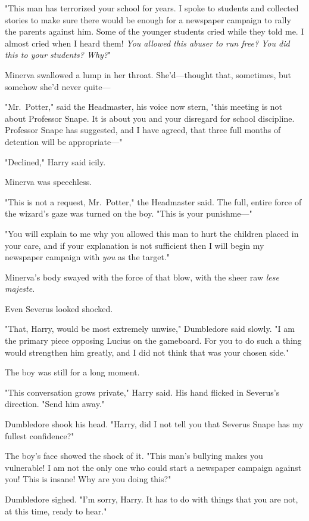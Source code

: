 "This man has terrorized your school for years. I spoke to students and 
collected stories to make sure there would be enough for a newspaper campaign 
to rally the parents against him. Some of the younger students cried while they 
told me. I almost cried when I heard them! \emph{You allowed this abuser to run 
free? You did this to your students? Why?}"

Minerva swallowed a lump in her throat. She'd---thought that, sometimes, but 
somehow she'd never quite---

"Mr.~Potter," said the Headmaster, his voice now stern, "this meeting is not 
about Professor Snape. It is about you and your disregard for school 
discipline. Professor Snape has suggested, and I have agreed, that three full 
months of detention will be appropriate---"

"Declined," Harry said icily.

Minerva was speechless.

"This is not a request, Mr.~Potter," the Headmaster said. The full, entire 
force of the wizard's gaze was turned on the boy. "This is your punishme---"

"You will explain to me why you allowed this man to hurt the children placed in 
your care, and if your explanation is not sufficient then I will begin my 
newspaper campaign with \emph{you} as the target."

Minerva's body swayed with the force of that blow, with the sheer raw 
\emph{lese majeste}.

Even Severus looked shocked.

"That, Harry, would be most extremely unwise," Dumbledore said slowly. "I am 
the primary piece opposing Lucius on the gameboard. For you to do such a thing 
would strengthen him greatly, and I did not think that was your chosen side."

The boy was still for a long moment.

"This conversation grows private," Harry said. His hand flicked in Severus's 
direction. "Send him away."

Dumbledore shook his head. "Harry, did I not tell you that Severus Snape has my 
fullest confidence?"

The boy's face showed the shock of it. "This man's bullying makes you 
vulnerable! I am not the only one who could start a newspaper campaign against 
you! This is insane! Why are you doing this?"

Dumbledore sighed. "I'm sorry, Harry. It has to do with things that you are 
not, at this time, ready to hear."

